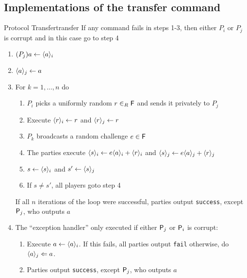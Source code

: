 \subsection{Implementations of the transfer command}
\begin{protocol}{Protocol Transfer}{transfer}
  If any command fails in steps 1-3, then either $P_i$ or $P_j$ is corrupt and in this case go to step 4
  \begin{enumerate}
  	\item $(P_j)a \leftarrow \commit{a}{i}$
    \item $\commit{a}{j} \leftarrow a$
    \item For $k=1, \dots, n$ do
    \begin{enumerate}
    	\item $P_i$ picks a uniformly random $r \in_R \F$ and sends it privately to $P_j$
      \item Execute $\commit{r}{i} \leftarrow r$ and $\commit{r}{j} \leftarrow r$
      \item $P_k$ broadcasts a random challenge $e \in \F$
      \item The parties execute $\commit{s}{i} \leftarrow e \commit{a}{i} + \commit{r}{i}$ and $\commit{s}{j}  \leftarrow e \commit{a}{j} + \commit{r}{j}$
      \item $s \leftarrow \commit{s}{i}$ and $s' \leftarrow \commit{s}{j}$
      \item If $s \neq s'$, all players goto step 4
    \end{enumerate}
    If all $n$ iterations of the loop were successful, parties output \texttt{success}, except $\P_j$, who outputs $a$
    \item The ``exception handler'' only executed if either $\P_j$ or $\P_i$ is corrupt:
    \begin{enumerate}
      \item Execute $a \leftarrow \commit{a}{i}$. If this fails, all parties output \texttt{fail} otherwise, do $\commit{a}{j} \Leftarrow a$.
      \item Parties output \texttt{success}, except $\P_j$, who outputs $a$
    \end{enumerate}
  \end{enumerate}
\end{protocol}

